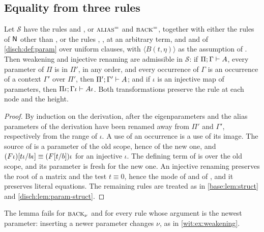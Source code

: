 \subsection{Equality from three rules}
\label{disch:sec:alias-eq}

\begin{lemma}
\label{disch:lem:alias-struct}
Let $\mathcal S$ have the rules  and , or
$\rulename{Alias}^{=}$ and $\rulename{Back}^{=}$, together with either the
rules of $\mathsf{N}$ other than , or the rules ,
,  at an arbitrary term, and  and
 of \cref{disch:def:param} over uniform clauses, with
$\langle B(t,\eta)\rangle$ as the assumption of . Then
weakening and injective renaming are admissible in $\mathcal S$: if
$\Pi;\Gamma\vdash A$, every parameter of $\Pi$ is in $\Pi'$, in any
order, and every occurrence of $\Gamma$ is an occurrence of a context
$\Gamma'$ over $\Pi'$, then $\Pi';\Gamma'\vdash A$; and if $\iota$ is an
injective map of parameters, then $\Pi\iota;\Gamma\iota\vdash A\iota$.
Both transformations preserve the rule at each node and the height.
\end{lemma}

\begin{proof}
By induction on the derivation, after the eigenparameters and the alias
parameters of the derivation have been renamed away from $\Pi'$ and
$\Gamma'$, respectively from the range of $\iota$. A use of an occurrence
is a use of its image. The source of  is a parameter of the
old scope, hence of the new one, and
$(F\iota)[t\iota/b\iota]\equiv(F[t/b])\iota$ for an injective
$\iota$. The defining term of  is over the old scope, and
its parameter is fresh for the new one. An injective renaming preserves the
root of a matrix and the test $t\equiv 0$, hence the mode of
 and of , and it preserves literal equations.
The remaining rules are treated as in \cref{base:lem:struct} and
\cref{disch:lem:param-struct}.
\end{proof}

The lemma fails for $\rulename{Back}_{\nu}$ and for every rule whose
argument is the newest parameter: inserting a newer parameter changes
$\nu$, as in \cref{wit:ex:weakening}.

